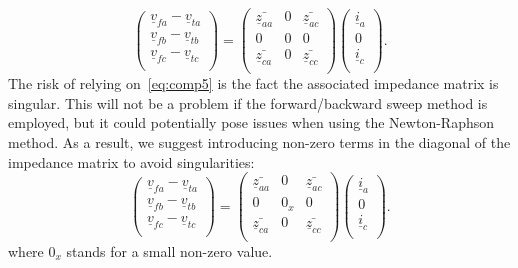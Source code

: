 \documentclass[11pt]{article}
\begin{document}
		\begin{equation}
		\begin{pmatrix}
			\underline{v}_{fa} - \underline{v}_{ta} \\
			\underline{v}_{fb} - \underline{v}_{tb} \\
			\underline{v}_{fc} - \underline{v}_{tc} \\
		\end{pmatrix}
		= 
		\begin{pmatrix}
			\bar{\underline{z}_{aa}} & 0 & \bar{\underline{z}_{ac}} \\
			0 & 0 & 0 \\
			\bar{\underline{z}_{ca}} & 0 & \bar{\underline{z}_{cc}} \\
		\end{pmatrix}	
		\begin{pmatrix}
			\underline{i}_a \\
			0 \\
			\underline{i}_c \\
		\end{pmatrix}.
		\label{eq:comp5}
	\end{equation}	
	The risk of relying on~\eqref{eq:comp5} is the fact the associated impedance matrix is singular. This will not be a problem if the forward/backward sweep method is employed, but it could potentially pose issues when using the Newton-Raphson method. As a result, we suggest introducing non-zero terms in the diagonal of the impedance matrix to avoid singularities:
		\begin{equation}
		\begin{pmatrix}
			\underline{v}_{fa} - \underline{v}_{ta} \\
			\underline{v}_{fb} - \underline{v}_{tb} \\
			\underline{v}_{fc} - \underline{v}_{tc} \\
		\end{pmatrix}
		= 
		\begin{pmatrix}
			\bar{\underline{z}_{aa}} & 0 & \bar{\underline{z}_{ac}} \\
			0 & 0_x & 0 \\
			\bar{\underline{z}_{ca}} & 0 & \bar{\underline{z}_{cc}} \\
		\end{pmatrix}	
		\begin{pmatrix}
			\underline{i}_a \\
			0 \\
			\underline{i}_c \\
		\end{pmatrix}.
		\label{eq:comp6}
	\end{equation}	
	where $0_x$ stands for a small non-zero value.
\end{document}
